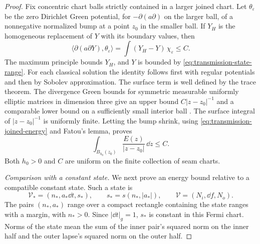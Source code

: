 \begin{proof}
Fix concentric chart balls strictly contained in a larger joined chart.
Let $\theta_\varepsilon$ be the zero Dirichlet Green potential, for
$-\partial(a\partial)$ on the larger ball, of a nonnegative normalized
bump at a point $z_0$ in the smaller ball.  If $Y_H$ is the homogeneous
replacement of $Y$ with its boundary values, then
\begin{equation}
 \big\langle\partial(a\partial Y),\theta_\varepsilon\big\rangle
  =\int(Y_H-Y)\,\chi_\varepsilon\leq C.
 \label{eq:transmission-green-pairing}
\end{equation}
The maximum principle bounds $Y_H$, and $Y$ is bounded by
\eqref{eq:transmission-state-range}.  For each classical solution the
identity follows first with regular potentials and then by Sobolev
approximation.  The surface term is well defined by the trace theorem.
The divergence Green bounds for symmetric measurable uniformly elliptic
matrices in dimension three give an upper bound $C|z-z_0|^{-1}$ and a
comparable lower bound on a sufficiently small interior ball
\citep[Theorem~7.1 and pp.~66--67]{LSW1963}.  The surface integral of
$|z-z_0|^{-1}$ is uniformly finite.  Letting the bump shrink, using
\eqref{eq:transmission-joined-energy} and Fatou's lemma, proves
\begin{equation}
 \int_{B_{h_0}(z_0)}\frac{E(z)}{|z-z_0|}\,\dd z\leq C.
 \label{eq:transmission-green-energy}
\end{equation}
Both $h_0>0$ and $C$ are uniform on the finite collection of seam charts.

\smallskip\noindent\emph{Comparison with a constant state.}
We next prove an energy bound relative to a compatible constant state.
Such a state is
\begin{equation}
 \mathcal V_*=(n_*,a_*\dd t,s_*),\qquad
 s_*=s(n_*,|a_*|),\qquad
 \mathcal V=(N_i,\dd f,N_o).
 \label{eq:transmission-reference}
\end{equation}
The pairs $(n_*,a_*)$ range over a compact rectangle containing the
state ranges with a margin, with $n_*>0$.  Since $|\dd t|_g=1$, $s_*$ is
constant in this Fermi chart.  Norms of the state mean the sum of the
inner pair's squared norm on the inner half and the outer lapse's
squared norm on the outer half.


\end{proof}
